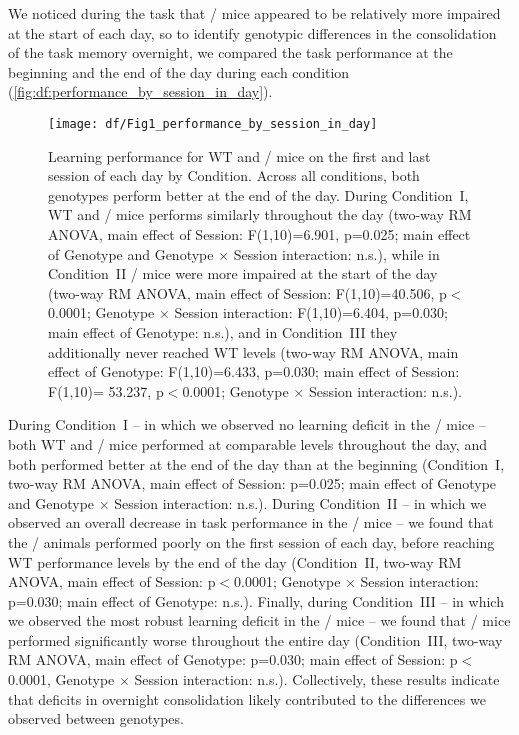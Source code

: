 We noticed during the task that \df/ mice appeared to be relatively more impaired at the start of each day, so to identify genotypic differences in the consolidation of the task memory overnight, we compared the task performance at the beginning and the end of the day during each condition (\autoref{fig:df:performance_by_session_in_day}).
\begin{figure}
	\centering
	\texttt{[image: df/Fig1\_performance\_by\_session\_in\_day]}
	\caption[Learning performance for WT and \df/ mice on the first and last session of each day]{Learning performance for WT and \df/ mice on the first and last session of each day by Condition. Across all conditions, both genotypes perform better at the end of the day. During Condition~I, WT and \df/ mice performs similarly throughout the day (two-way RM ANOVA, main effect of Session: F(1,10)=6.901, p=0.025; main effect of Genotype and Genotype $\times$ Session interaction: n.s.), while in Condition~II \df/ mice were more impaired at the start of the day (two-way RM ANOVA, main effect of Session: F(1,10)=40.506, p$<$0.0001; Genotype $\times$ Session interaction: F(1,10)=6.404, p=0.030; main effect of Genotype: n.s.), and in Condition~III they additionally never reached WT levels (two-way RM ANOVA, main effect of Genotype: F(1,10)=6.433, p=0.030; main effect of Session: F(1,10)= 53.237, p$<$0.0001; Genotype $\times$ Session interaction: n.s.).}
	\label{fig:df:performance_by_session_in_day}
\end{figure}
During Condition~I -- in which we observed no learning deficit in the \df/ mice -- both WT and \df/ mice performed at comparable levels throughout the day, and both performed better at the end of the day than at the beginning (Condition~I, two-way RM ANOVA, main effect of Session: p=0.025; main effect of Genotype and Genotype $\times$ Session interaction: n.s.). During Condition~II -- in which we observed an overall decrease in task performance in the \df/ mice --  we found that the \df/ animals performed poorly on the first session of each day, before reaching WT performance levels by the end of the day (Condition~II, two-way RM ANOVA, main effect of Session: p$<$0.0001; Genotype $\times$ Session interaction: p=0.030; main effect of Genotype: n.s.). Finally, during Condition~III -- in which we observed the most robust learning deficit in the \df/ mice -- we found that \df/ mice performed significantly worse throughout the entire day (Condition~III, two-way RM ANOVA, main effect of Genotype: p=0.030; main effect of Session: p$<$0.0001, Genotype $\times$ Session interaction: n.s.). Collectively, these results indicate that deficits in overnight consolidation likely contributed to the differences we observed between genotypes.

